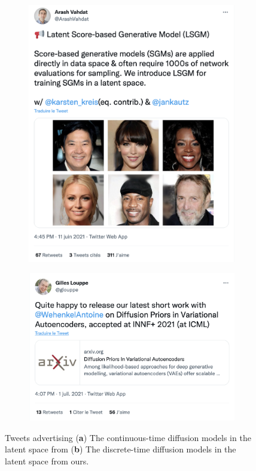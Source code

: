 \begin{figure}
  \centering
  \begin{subfigure}[b]{.48\textwidth}
    \centering
    \includegraphics[width=.95\textwidth]{figures/impact_scholar/cont_diff_tweet.png}
    \caption{}
    \label{fig:cont_tweet}
  \end{subfigure}
  \begin{subfigure}[b]{.48\textwidth}
    \centering
    \includegraphics[width=.95\textwidth]{figures/impact_scholar/discret_diff_tweet.png}
    \caption{}
    \label{fig:discrete_tweet}
  \end{subfigure}
  \caption{Tweets advertising (\textbf{a}) The continuous-time diffusion models in the latent space from \citet{vahdat2021score} (\textbf{b}) The discrete-time diffusion models in the latent space from ours.}
\end{figure}
